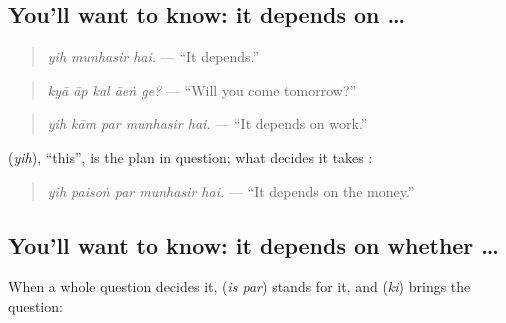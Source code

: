 \subsection*{You'll want to know: it depends on …}
\begin{quote}
\textbf{  }
\end{quote}

\begin{quote}
\emph{yih munhasir hai.} — \textquotedblleft{}It depends.\textquotedblright{}
\end{quote}

\begin{quote}
\textbf{    }
\end{quote}

\begin{quote}
\emph{kyā āp kal āeṅ ge?} — \textquotedblleft{}Will you come tomorrow?\textquotedblright{}
\end{quote}

\begin{quote}
\textbf{    }
\end{quote}

\begin{quote}
\emph{yih kām par munhasir hai.} — \textquotedblleft{}It depends on work.\textquotedblright{}
\end{quote}

\textbf{} (\emph{yih}), \textquotedblleft{}this\textquotedblright{}, is the plan in question; what decides it takes \textbf{}:

\begin{quote}
\textbf{    }
\end{quote}

\begin{quote}
\emph{yih paisoṅ par munhasir hai.} — \textquotedblleft{}It depends on the money.\textquotedblright{}
\end{quote}

\subsection*{You'll want to know: it depends on whether …}
When a whole question decides it, \textbf{ } (\emph{is par}) stands for it, and \textbf{} (\emph{ki}) brings the question:

\begin{quote}
\textbf{    }
\end{quote}

